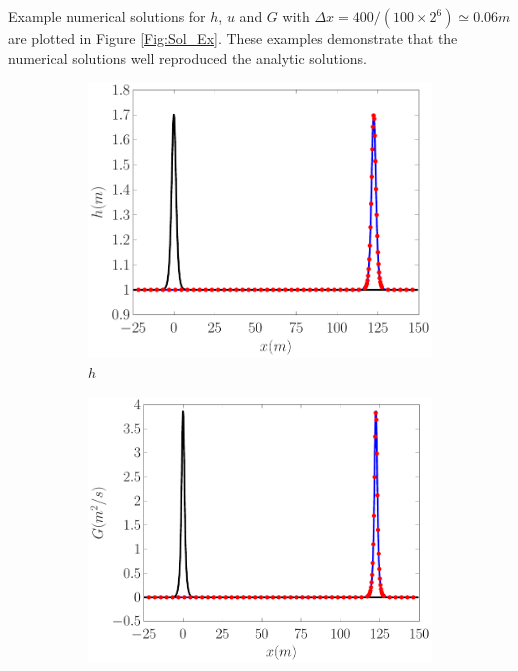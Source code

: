 \documentclass[10pt]{elsarticle}
\begin{document}
Example numerical solutions for $h$, $u$ and $G$ with $\Delta x = 400 / (100 \times 2^{6}) \simeq 0.06m$ are plotted in Figure \ref{Fig:Sol_Ex}. These examples demonstrate that the numerical solutions well reproduced the analytic solutions.
%
\begin{figure}
	\centering
	\begin{subfigure}{0.32\textwidth}
		\centering
		\includegraphics[width=\textwidth]{./Figures/Simulations/Validation/Serre/hEx.pdf}
		\caption{$h$}
	\end{subfigure}
	\begin{subfigure}{0.32\textwidth}
		\centering
		\includegraphics[width=\textwidth]{./Figures/Simulations/Validation/Serre/GEx.pdf}

\end{subfigure}
\end{figure}
\end{document}
